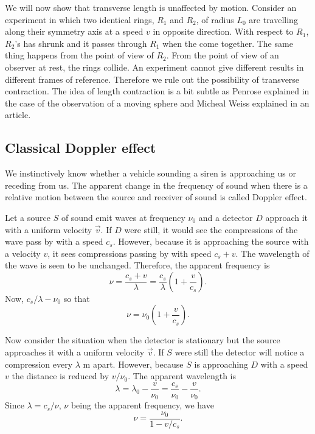 We will now show that transverse length is unaffected by motion. Consider an 
experiment in which two 
identical rings, $R_1$ and $R_2$, of radius $L_0$ are travelling along their 
symmetry axis at a speed $v$ in opposite direction. With respect to $R_1$, 
$R_2$'s has shrunk and it passes through $R_1$ when the come together. The 
same thing happens from the point of view of $R_2$. From the point of view of 
an observer at rest, the rings collide. An experiment cannot give different 
results in different frames of reference. Therefore we rule out the possibility 
of transverse contraction. The idea of length contraction is a bit subtle as
Penrose \cite{penrose1959apparent} explained in the case of the observation of
a moving sphere and Micheal Weiss \cite{weiss1995} explained in an article.

\subsection{Classical Doppler effect}
We instinctively know whether a vehicle sounding a siren is approaching us or
receding from us. The apparent change in the frequency of sound when there is
a relative motion between the source and receiver of sound is called Doppler
effect. 

Let a source $S$ of sound emit waves at frequency $\nu_0$ and a detector $D$
approach it with a uniform velocity $\vec{v}$. If $D$ were still, it would
see the compressions of the wave pass by with a speed $c_s$. However, because
it is approaching the source with a velocity $v$, it sees compressions passing
by with speed $c_s + v$. The wavelength of the wave is seen to be unchanged.
Therefore, the apparent frequency is
\[
\nu = \frac{c_s + v}{\lambda} = \frac{c_s}{\lambda}
\left(1 + \frac{v}{c_s}\right).
\]
Now, $c_s/\lambda - \nu_0$ so that
\begin{equation}\label{c1s2e10}
\nu = \nu_0\left(1 + \frac{v}{c_s}\right).
\end{equation}

Now consider the situation when the detector is stationary but the source
approaches it with a uniform velocity $\vec{v}$. If $S$ were still the detector
will notice a compression every $\lambda$ m apart. However, because $S$ is
approaching $D$ with a speed $v$ the distance is reduced by $v/\nu_0$. The 
apparent wavelength is
\[
\lambda = \lambda_0 - \frac{v}{\nu_0} = \frac{c_s}{\nu_0} - \frac{v}{\nu_0}.
\]
Since $\lambda = c_s/\nu$, $\nu$ being the apparent frequency, we have
\begin{equation}\label{c1s2e11}
\nu = \frac{\nu_0}{1 - v/c_s}.
\end{equation}

